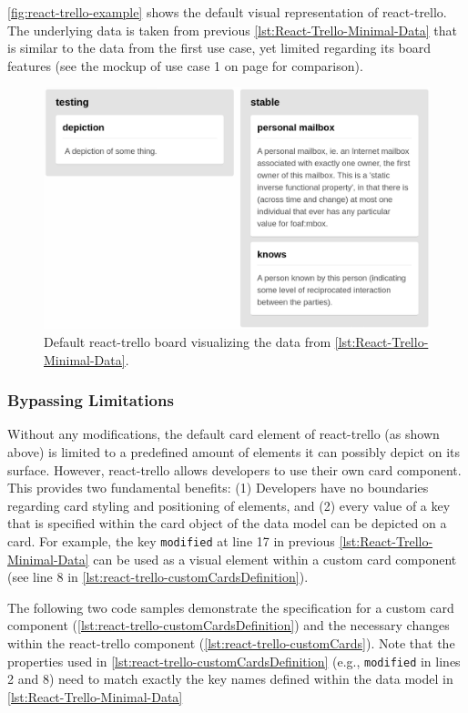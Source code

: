 \noindent \autoref{fig:react-trello-example} shows the default visual representation of react-trello. The underlying data is taken from previous \autoref{lst:React-Trello-Minimal-Data} that is similar to the data from the first use case, yet limited regarding its board features (see the mockup of use case 1 on page \pageref{fig:RMB Use Case 1} for comparison).


\begin{figure}[H]
\centering
\includegraphics[width=125mm]{img/react-trello-example.png}
	\caption[Default react-trello Board]{Default react-trello board visualizing the data from \autoref{lst:React-Trello-Minimal-Data}.}
	\label{fig:react-trello-example}
\end{figure}



\subsubsection{Bypassing Limitations}

Without any modifications, the default card element of react-trello (as shown above) is limited to a predefined amount of elements it can possibly depict on its surface. However, react-trello allows developers to use their own card component. This provides two fundamental benefits: (1) Developers have no boundaries regarding card styling and positioning of elements, and (2) every value of a key that is specified within the card object of the data model can be depicted on a card. For example, the key \texttt{modified} at line 17 in previous \autoref{lst:React-Trello-Minimal-Data} can be used as a visual element within a custom card component (see line 8 in \autoref{lst:react-trello-customCardsDefinition}).

The following two code samples demonstrate the specification for a custom card component (\autoref{lst:react-trello-customCardsDefinition}) and the necessary changes within the react-trello component (\autoref{lst:react-trello-customCards}). Note that the properties used in \autoref{lst:react-trello-customCardsDefinition} (e.g., \texttt{modified} in lines 2 and 8) need to match exactly the key names defined within the data model in \autoref{lst:React-Trello-Minimal-Data}


